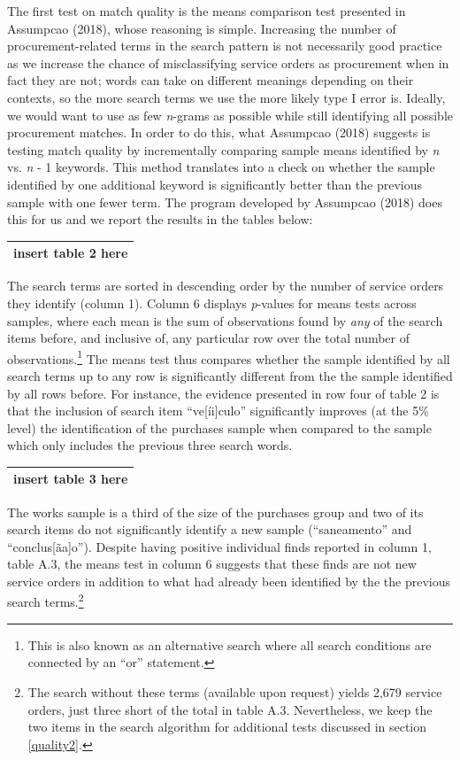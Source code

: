 \documentclass[]{article}
\let\rmarkdownfootnote\footnote%
\def\footnote{\protect\rmarkdownfootnote}
\theoremstyle{definition}
\theoremstyle{definition}
\theoremstyle{definition}
\theoremstyle{remark}
\begin{document}
The first test on match quality is the means comparison test presented
in Assumpcao (2018), whose reasoning is simple. Increasing the number of
procurement-related terms in the search pattern is not necessarily good
practice as we increase the chance of misclassifying service orders as
procurement when in fact they are not; words can take on different
meanings depending on their contexts, so the more search terms we use
the more likely type I error is. Ideally, we would want to use as few
\emph{n}-grams as possible while still identifying all possible
procurement matches. In order to do this, what Assumpcao (2018) suggests
is testing match quality by incrementally comparing sample means
identified by \emph{n} vs. \emph{n} - 1 keywords. This method translates
into a check on whether the sample identified by one additional keyword
is significantly better than the previous sample with one fewer term.
The program developed by Assumpcao (2018) does this for us and we report
the results in the tables below:

\begin{longtable}[]{@{}c@{}}
\toprule
\endhead
insert table 2 here\tabularnewline
\bottomrule
\end{longtable}

The search terms are sorted in descending order by the number of service
orders they identify (column 1). Column 6 displays \emph{p}-values for
means tests across samples, where each mean is the sum of observations
found by \emph{any} of the search items before, and inclusive of, any
particular row over the total number of observations.\footnote{This is
  also known as an alternative search where all search conditions are
  connected by an ``or'' statement.} The means test thus compares
whether the sample identified by all search terms up to any row is
significantly different from the the sample identified by all rows
before. For instance, the evidence presented in row four of table 2 is
that the inclusion of search item ``ve{[}íi{]}culo'' significantly
improves (at the 5\% level) the identification of the purchases sample
when compared to the sample which only includes the previous three
search words.

\begin{longtable}[]{@{}c@{}}
\toprule
\endhead
insert table 3 here\tabularnewline
\bottomrule
\end{longtable}

The works sample is a third of the size of the purchases group and two
of its search items do not significantly identify a new sample
(``saneamento'' and ``conclus{[}ãa{]}o''). Despite having positive
individual finds reported in column 1, table A.3, the means test in
column 6 suggests that these finds are not new service orders in
addition to what had already been identified by the the previous search
terms.\footnote{The search without these terms (available upon request)
  yields 2,679 service orders, just three short of the total in table
  A.3. Nevertheless, we keep the two items in the search algorithm for
  additional tests discussed in section \ref{quality2}.}
\end{document}
